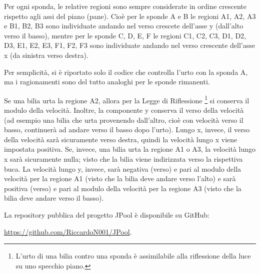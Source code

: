 \documentclass[12pt,a4paper]{report}
\begin{document}
Per ogni sponda, le relative regioni sono sempre considerate in ordine crescente rispetto agli assi del piano (pane). Cioè per le sponde A e B le regioni A1, A2, A3 e B1, B2, B3 sono individuate andando nel verso crescete dell'asse y (dall'alto verso il basso), mentre per le sponde C, D, E, F le regioni C1, C2, C3, D1, D2, D3, E1, E2, E3, F1, F2, F3 sono individuate andando nel verso crescente dell'asse x (da sinistra verso destra).

\vspace{3mm}

Per semplicità, si è riportato solo il codice che controlla l'urto con la sponda A, ma i ragionamenti sono del tutto analoghi per le sponde rimanenti.

\vspace{3mm}

Se una bilia urta la regione A2, allora per la Legge di Riflessione \footnote{L'urto di una bilia contro una sponda è assimilabile alla riflessione della luce su uno specchio piano.} si conserva il modulo della velocità.
Inoltre, la componente y conserva il verso della velocità (ad esempio una bilia che urta provenendo dall'altro, cioè con velocità verso il basso, continuerà ad andare verso il basso dopo l'urto).
Lungo x, invece, il verso della velocità sarà sicuramente verso destra, quindi la velocità lungo x viene impostata positiva.
Se, invece, una bilia urta la regione A1 o A3, la velocità lungo x sarà sicuramente nulla; visto che la bilia viene indirizzata verso la rispettiva buca.
La velocità lungo y, invece, sarà negativa (verso) e pari al modulo della velocità per la regione A1 (visto che la bilia deve andare verso l'alto) e sarà positiva (verso) e pari al modulo della velocità per la regione A3 (visto che la bilia deve andare verso il basso).

\pagebreak



\vspace{10mm}

La repository pubblica del progetto JPool è disponibile su GitHub:

\url{https://github.com/RiccardoN001/JPool}.
\end{document}
